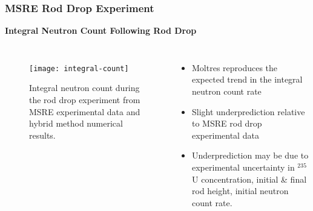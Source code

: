 \begin{frame}
  \frametitle{MSRE Rod Drop Experiment}
  \textbf{Integral Neutron Count Following Rod Drop}
  \begin{columns}
    \column{5.5cm}
    \begin{figure}[t]
      \centering
      \texttt{[image: integral-count]}
      \caption{Integral neutron count during the rod drop experiment from \gls{MSRE} experimental data
      and hybrid method numerical results.}
      \label{fig:integral-count}
    \end{figure}
    \column{5.5cm}
    \begin{itemize}
      \item Moltres reproduces the expected trend in the integral neutron count rate
      \item Slight underprediction relative to MSRE rod drop experimental data
      \item Underprediction may be due to experimental uncertainty in $^{235}$U concentration,
        initial \& final rod height, initial neutron count rate.
    \end{itemize}
  \end{columns}
\end{frame}


